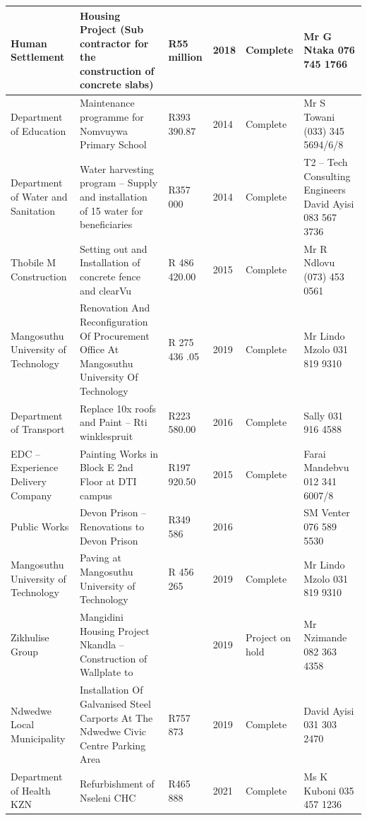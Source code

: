 \documentclass[a4paper,11pt]{article}
\begin{document}
{\begin{longtable}{@{} p{2.8cm} p{4.6cm} p{1.6cm} C{1.0cm} p{1.6cm} p{3.4cm} @{}}
  Human Settlement & Housing Project (Sub contractor for the construction of concrete slabs) & R55 million & 2018 & Complete & Mr G Ntaka 076 745 1766 \\
  \midrule
  Department of Education & Maintenance programme for Nomvuywa Primary School & R393 390.87 & 2014 & Complete & Mr S Towani (033) 345 5694/6/8 \\
  \midrule
  Department of Water and Sanitation & Water harvesting program – Supply and installation of 15 water for beneficiaries & R357 000 & 2014 & Complete & T2 – Tech Consulting Engineers David Ayisi 083 567 3736 \\
  \midrule
  Thobile M Construction & Setting out and Installation of concrete fence and clearVu & R 486 420.00 & 2015 & Complete & Mr R Ndlovu (073) 453 0561 \\
  \midrule
  Mangosuthu University of Technology & Renovation And Reconfiguration Of Procurement Office At Mangosuthu University Of Technology & R 275 436 .05 & 2019 & Complete & Mr Lindo Mzolo 031 819 9310 \\
  \midrule
  Department of Transport & Replace 10x roofs and Paint – Rti winklespruit & R223 580.00 & 2016 & Complete & Sally 031 916 4588 \\
  \midrule
  EDC – Experience Delivery Company & Painting Works in Block E 2nd Floor at DTI campus & R197 920.50 & 2015 & Complete & Farai Mandebvu 012 341 6007/8 \\
  \midrule
  Public Works & Devon Prison – Renovations to Devon Prison & R349 586 & 2016 & & SM Venter 076 589 5530 \\
  \midrule
  Mangosuthu University of Technology & Paving at Mangosuthu University of Technology & R 456 265 & 2019 & Complete & Mr Lindo Mzolo 031 819 9310 \\
  \midrule
  Zikhulise Group & Mangidini Housing Project Nkandla – Construction of Wallplate to & & 2019 & Project on hold & Mr Nzimande 082 363 4358 \\
  \midrule
  Ndwedwe Local Municipality & Installation Of Galvanised Steel Carports At The Ndwedwe Civic Centre Parking Area & R757 873 & 2019 & Complete & David Ayisi 031 303 2470 \\
  \midrule
  Department of Health KZN & Refurbishment of Nseleni CHC & R465 888 & 2021 & Complete & Ms K Kuboni 035 457 1236 \\
  \midrule

\end{longtable}}
\end{document}
